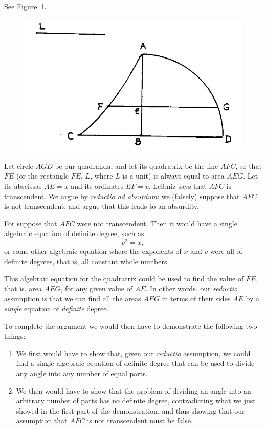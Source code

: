 \documentclass[polutonikogreek,english,twoside,openright]{article}
\begin{document}
  See Figure~\ref{circquad2}.
  \begin{figure}[htp]
\begin{center}
\includegraphics[width=.75\textwidth]{fig/Figure31}
\caption{}
\label{circquad2}
\vspace{-10pt}
\end{center}
\end{figure} 

Let circle $AGD$ be our quadranda, and let its quadratrix be the line
$AFC$, so that $FE$ (or the rectangle $FE$, $L$, where $L$ is a unit)
is always equal to area $AEG$.  Let its abscissas $AE = x$ and its
ordinates $EF = v$.  Leibniz says that $AFC$ is transcendent.  We
argue by {\em reductio ad absurdum}: we (falsely) suppose that $AFC$
is not transcendent, and argue that this leads to an absurdity.
   
For suppose that $AFC$ were not transcendent.  Then it would have a
single algebraic equation of definite degree, such as
$$v^2 = x,$$
or some other algebraic equation where the exponents of $x$ and $v$
were all of definite degrees, that is, all constant whole numbers.

This algebraic equation for the quadratrix could be used to find the
value of $FE$, that is, area $AEG$, for any given value of $AE$.  In
other words, our {\em reductio} assumption is that we can find all the
areas $AEG$ in terms of their sides $AE$ by a {\em single} equation of
{\em definite} degree.

To complete the argument we would then have to demonstrate the following two things:
\begin{enumerate}
\item We first would have to show that, given our {\em reductio}
  assumption, we could find a single algebraic equation of definite
  degree that can be used to divide any angle into any number of equal
  parts.
\item We then would have to show that the problem of dividing an angle
  into an arbitrary number of parts has no definite degree,
  contradicting what we just showed in the first part of the
  demonstration, and thus showing that our assumption that $AFC$ is
  not transcendent must be false.
\end{enumerate}\label{endtc}
\end{document}
